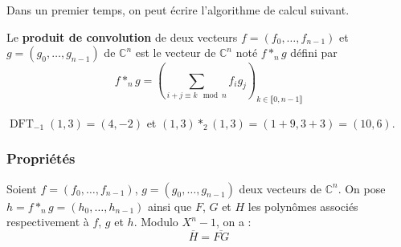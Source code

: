   Dans un premier temps, on peut écrire l'algorithme de calcul suivant.


  \begin{definition}
    Le \textbf{produit de convolution} de deux vecteurs $f = (f_0, \dots, f_{n-1})$ et $g = (g_0, \dots, g_{n-1})$ de $\mathbb{C}^n$ est le vecteur de $\mathbb{C}^n$ noté $f *_n g$ défini par
    \[ f *_n g = \left( \sum_{i+j \equiv k \mod n} f_ig_j \right)_{k \in \llbracket 0, n-1 \rrbracket} \]
  \end{definition}

  \begin{example}
    $\operatorname{DFT}_{-1}(1,3) = (4, -2)$ et $(1,3) *_2 (1,3) = (1 + 9, 3 + 3) = (10, 6)$.
  \end{example}

  \subsubsection{Propriétés}

  \begin{proposition}
    \label{transformee-de-fourier-discrete-1}
    Soient $f = (f_0, \dots, f_{n-1})$, $g = (g_0, \dots, g_{n-1})$ deux vecteurs de $\mathbb{C}^n$. On pose $h = f *_n g = (h_0, \dots, h_{n-1})$ ainsi que $F$, $G$ et $H$ les polynômes associés respectivement à $f$, $g$ et $h$. Modulo $X^n - 1$, on a :
    \[ \overline{H} = \overline{FG} \]
  \end{proposition}

